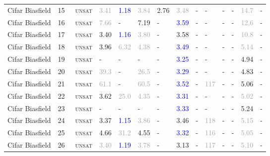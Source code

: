 \begin{center}
{\begin{longtable}{@{}llllllllllllll@{}}
Cifar Biasfield & 15 & ~\textsc{unsat} & \textcolor{darkgray}{3.41} & \textcolor{blue}{1.18} & \textcolor{darkgray}{3.84} & \textcolor{second}{2.76} & \textcolor{darkgray}{3.48} & - & - & - & - & \textcolor{darkgray}{14.7} & - \\
Cifar Biasfield & 16 & ~\textsc{unsat} & \textcolor{darkgray}{7.66} & - & \textcolor{second}{7.19} & - & \textcolor{blue}{3.59} & - & - & - & - & \textcolor{darkgray}{12.6} & - \\
Cifar Biasfield & 17 & ~\textsc{unsat} & \textcolor{second}{3.40} & \textcolor{blue}{1.16} & \textcolor{darkgray}{3.80} & - & \textcolor{second}{3.58} & - & - & - & - & \textcolor{darkgray}{10.8} & - \\
Cifar Biasfield & 18 & ~\textsc{unsat} & \textcolor{second}{3.96} & \textcolor{darkgray}{6.32} & \textcolor{darkgray}{4.38} & - & \textcolor{blue}{3.49} & - & - & - & - & \textcolor{darkgray}{5.14} & - \\
Cifar Biasfield & 19 & ~\textsc{unsat} & - & - & - & - & \textcolor{blue}{3.25} & - & - & - & - & \textcolor{second}{4.94} & - \\
Cifar Biasfield & 20 & ~\textsc{unsat} & \textcolor{darkgray}{39.3} & - & \textcolor{darkgray}{26.5} & - & \textcolor{blue}{3.29} & - & - & - & - & \textcolor{second}{4.83} & - \\
Cifar Biasfield & 21 & ~\textsc{unsat} & \textcolor{darkgray}{61.1} & - & \textcolor{darkgray}{60.5} & - & \textcolor{blue}{3.52} & - & \textcolor{darkgray}{117} & - & - & \textcolor{second}{5.06} & - \\
Cifar Biasfield & 22 & ~\textsc{unsat} & \textcolor{second}{3.62} & \textcolor{darkgray}{25.0} & \textcolor{darkgray}{4.35} & - & \textcolor{blue}{3.31} & - & - & - & - & \textcolor{darkgray}{5.02} & - \\
Cifar Biasfield & 23 & ~\textsc{unsat} & - & - & - & - & \textcolor{blue}{3.33} & - & - & - & - & \textcolor{second}{5.24} & - \\
Cifar Biasfield & 24 & ~\textsc{unsat} & \textcolor{second}{3.37} & \textcolor{blue}{1.15} & \textcolor{darkgray}{3.86} & - & \textcolor{second}{3.46} & - & \textcolor{darkgray}{118} & - & - & \textcolor{darkgray}{5.15} & - \\
Cifar Biasfield & 25 & ~\textsc{unsat} & \textcolor{second}{4.66} & \textcolor{darkgray}{31.2} & \textcolor{second}{4.55} & - & \textcolor{blue}{3.32} & - & \textcolor{darkgray}{116} & - & - & \textcolor{darkgray}{5.05} & - \\
Cifar Biasfield & 26 & ~\textsc{unsat} & \textcolor{darkgray}{3.40} & \textcolor{blue}{1.19} & \textcolor{darkgray}{3.78} & - & \textcolor{second}{3.13} & - & \textcolor{darkgray}{117} & - & - & \textcolor{darkgray}{5.10} & - \\

\end{longtable}}
\end{center}
